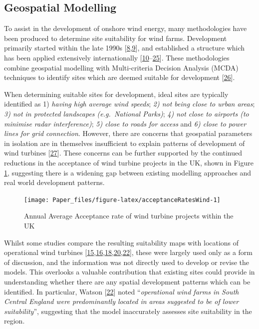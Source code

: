 \documentclass[a4paper,]{article}
\theoremstyle{definition}
\theoremstyle{definition}
\theoremstyle{definition}
\theoremstyle{remark}
\begin{document}
\subsection{Geospatial Modelling}\label{geospatial-modelling}

To assist in the development of onshore wind energy, many methodologies
have been produced to determine site suitability for wind farms.
Development primarily started within the late 1990s
{[}\protect\hyperlink{ref-Voivontas1998}{8},\protect\hyperlink{ref-Baban2001}{9}{]},
and established a structure which has been applied extensively
internationally
{[}\protect\hyperlink{ref-Hansen2005}{10}--\protect\hyperlink{ref-Baseer2017}{25}{]}.
These methodologies combine geospatial modelling with Multi-criteria
Decision Analysis (MCDA) techniques to identify sites which are deemed
suitable for development
{[}\protect\hyperlink{ref-Malczewski2004}{26}{]}.

When determining suitable sites for development, ideal sites are
typically identified as 1) \emph{having high average wind speeds};
\emph{2) not being close to urban areas}; \emph{3) not in protected
landscapes (e.g.~National Parks)}; \emph{4) not close to airports (to
minimise radar interference)}; \emph{5) close to roads for access} and
\emph{6) close to power lines for grid connection}. However, there are
concerns that geospatial parameters in isolation are in themselves
insufficient to explain patterns of development of wind turbines
{[}\protect\hyperlink{ref-VanderHorst2010}{27}{]}. These concerns can be
further supported by the continued reductions in the acceptance of wind
turbine projects in the UK, shown in Figure
\ref{fig:acceptanceRatesWind}, suggesting there is a widening gap
between existing modelling approaches and real world development
patterns.

\begin{figure}[h]

{\centering \texttt{[image: Paper\_files/figure-latex/acceptanceRatesWind-1]} 

}

\caption{Annual Average Acceptance rate of wind turbine projects within the UK}\label{fig:acceptanceRatesWind}
\end{figure}

Whilst some studies compare the resulting suitability maps with
locations of operational wind turbines
{[}\protect\hyperlink{ref-Aydin2010}{15},\protect\hyperlink{ref-VanHaaren2011}{16},\protect\hyperlink{ref-Gass2013}{18},\protect\hyperlink{ref-Miller2014}{20},\protect\hyperlink{ref-Watson2015}{22}{]},
these were largely used only as a form of discussion, and the
information was not directly used to develop or revise the models. This
overlooks a valuable contribution that existing sites could provide in
understanding whether there are any spatial development patterns which
can be identified. In particular, Watson
{[}\protect\hyperlink{ref-Watson2015}{22}{]} noted ``\emph{operational
wind farms in South Central England were predominantly located in areas
suggested to be of lower suitability}'', suggesting that the model
inaccurately assesses site suitability in the region.
\end{document}
